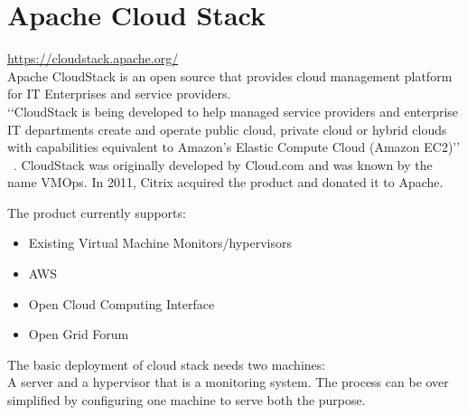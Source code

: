 \section{Apache Cloud Stack}
\url{ https://cloudstack.apache.org/} \\
Apache CloudStack is an open source that provides cloud management platform for IT
Enterprises and service providers. \\
‘‘CloudStack is being developed to help managed service providers and enterprise IT 
departments create and operate public cloud, private cloud or hybrid clouds
with capabilities equivalent to Amazon's Elastic Compute Cloud (Amazon EC2)’’  
~\cite{ hid-sp18-417-techtarget-cloudStack}. 
CloudStack was originally developed by Cloud.com and was known by the name VMOps. 
In 2011, Citrix acquired the product and donated it to Apache. 

The product currently supports:
\begin{itemize}
\item        Existing Virtual Machine Monitors/hypervisors
\item        AWS
\item        Open Cloud Computing Interface
\item        Open Grid Forum
\end{itemize}
 The basic deployment of cloud stack needs two machines: \\
 A server and a hypervisor that is a monitoring system. 
 The process can be over simplified by configuring one machine 
 to serve both the purpose.
